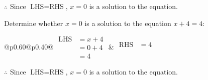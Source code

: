\documentclass[12pt]{article}
\newcounter{minipagecount}
\begin{document}
\begin{multicols}{2}
\begin{minipage}[t]{0.40\textwidth}
    \noindent \(\therefore\) Since \(\text{LHS} = \text{RHS}\), \(x = 0\) is  a solution to the equation.

\end{minipage}

\vspace*{0.5ex}
\vfill{}
\noindent{(\theminipagecount)}\hspace{0.1mm} %
\begin{minipage}[t]{0.40\textwidth} %

    \noindent Determine whether \(x = 0\) is a solution to the equation \(x + 4 = 4\):
    \vspace{2pt}  %

    \noindent
    \renewcommand{\arraystretch}{1.3} %
    \begin{tabular}{@{}p{0.60\linewidth}@{}p{0.40\linewidth}@{}}
        \(\begin{aligned}
            \text{LHS} &= x + 4 \\
                    &= 0 + 4 \\
                    &= 4 
        \end{aligned}\) &
        \(\begin{aligned}
            \text{RHS} &= 4\\
                    & \\
                    &
        \end{aligned}\)
    \end{tabular}
    \renewcommand{\arraystretch}{1.0} %
    \vspace{2pt}  %

    \noindent \(\therefore\) Since \(\text{LHS} = \text{RHS}\), \(x = 0\) is  a solution to the equation.

\end{minipage}

\vspace*{0.5ex}
\vfill{}
\noindent{(\theminipagecount)}\hspace{0.1mm} %
\begin{minipage}[t]{0.40\textwidth} %


\end{minipage}
\end{multicols}
\end{document}
